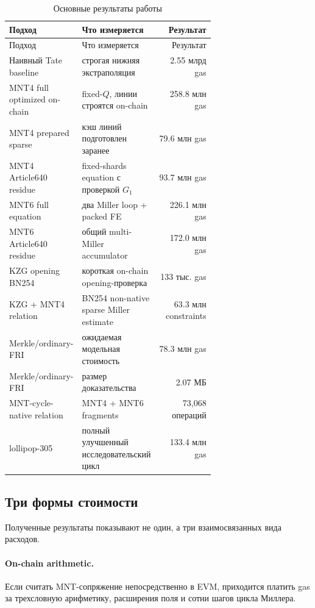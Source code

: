 \documentclass[12pt,a4paper]{article}
\begin{document}
\begin{longtable}{p{0.31\linewidth}p{0.36\linewidth}r}
\caption{Основные результаты работы}\\
\toprule
Подход & Что измеряется & Результат \\
\midrule
\endfirsthead
\toprule
Подход & Что измеряется & Результат \\
\midrule
\endhead
Наивный Tate baseline & строгая нижняя экстраполяция & 2.55 млрд gas \\
MNT4 full optimized on-chain & fixed-$Q$, линии строятся on-chain & 258.8 млн gas \\
MNT4 prepared sparse & кэш линий подготовлен заранее & 79.6 млн gas \\
MNT4 Article640 residue & fixed-shards equation с проверкой $G_1$ & 93.7 млн gas \\
MNT6 full equation & два Miller loop + packed FE & 226.1 млн gas \\
MNT6 Article640 residue & общий multi-Miller accumulator & 172.0 млн gas \\
KZG opening BN254 & короткая on-chain opening-проверка & 133 тыс. gas \\
KZG + MNT4 relation & BN254 non-native sparse Miller estimate & 63.3 млн constraints \\
Merkle/ordinary-FRI & ожидаемая модельная стоимость & 78.3 млн gas \\
Merkle/ordinary-FRI & размер доказательства & 2.07 МБ \\
MNT-cycle-native relation & MNT4 + MNT6 fragments & 73,068 операций \\
lollipop-305 & полный улучшенный исследовательский цикл & 133.4 млн gas \\
\bottomrule
\end{longtable}

\subsection{Три формы стоимости}

Полученные результаты показывают не один, а три взаимосвязанных вида расходов.

\paragraph{On-chain arithmetic.}
Если считать MNT-сопряжение непосредственно в EVM, приходится платить gas за
трехсловную арифметику, расширения поля и сотни шагов цикла Миллера.
\end{document}
